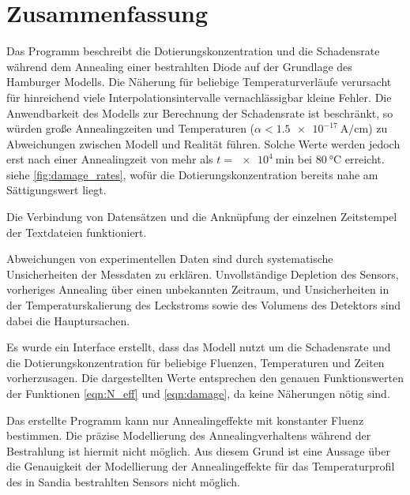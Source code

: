 \chapter{Zusammenfassung}
Das Programm beschreibt die Dotierungskonzentration und die Schadensrate während dem
Annealing einer bestrahlten Diode
auf der Grundlage des Hamburger Modells. Die Näherung für beliebige
Temperaturverläufe verursacht für hinreichend viele Interpolationsintervalle
vernachlässigbar kleine Fehler. Die Anwendbarkeit des Modells zur Berechnung der Schadensrate ist
beschränkt, so würden große Annealingzeiten und Temperaturen ($\alpha < \SI{1.5e-17}{\ampere\per\centi\meter}$) zu Abweichungen
zwischen Modell und Realität führen. Solche Werte werden jedoch erst nach
einer Annealingzeit von mehr als $t=\SI{e4}{\minute}$ bei $\SI{80}{\celsius}$ erreicht. siehe
\ref{fig:damage_rates}, wofür
die Dotierungskonzentration bereits nahe am Sättigungswert liegt.

Die Verbindung von Datensätzen und die Anknüpfung der einzelnen Zeitstempel der
Textdateien funktioniert.

Abweichungen von experimentellen Daten sind durch systematische Unsicherheiten der Messdaten
zu erklären. Unvollständige Depletion des Sensors, vorheriges Annealing über einen
unbekannten Zeitraum, und Unsicherheiten in der Temperaturskalierung des Leckstroms sowie
des Volumens des Detektors sind dabei die Hauptursachen.

Es wurde ein Interface erstellt, dass das Modell nutzt um die Schadensrate und die Dotierungskonzentration
für beliebige Fluenzen, Temperaturen und
Zeiten vorherzusagen. Die dargestellten Werte entsprechen den genauen Funktionswerten
der Funktionen \ref{eqn:N_eff} und \ref{eqn:damage}, da keine Näherungen nötig sind.

Das erstellte Programm kann nur Annealingeffekte mit konstanter Fluenz bestimmen.
Die präzise Modellierung des Annealingverhaltens während der Bestrahlung ist
hiermit nicht möglich. Aus diesem Grund ist eine Aussage über die Genauigkeit der
Modellierung der Annealingeffekte für das Temperaturprofil des in Sandia bestrahlten Sensors nicht möglich.

